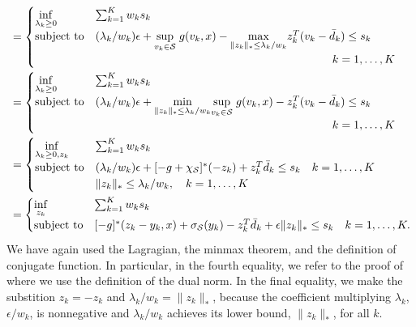 \documentclass[12pt]{article}
\theoremstyle{thmstyleone}%
\theoremstyle{thmstyletwo}%
\theoremstyle{thmstylethree}%
\newcommand{\reviewChanges}{}
\begin{document}
\begin{appendices}
\begin{equation*}
\begin{aligned}
&= \begin{cases}
	\underset{\lambda_k \geq 0}{\inf} &  \sum_{k=1} ^K  w_k s_k \\
	\mbox{subject to} & (\lambda_k/w_k)\epsilon + \underset{v_k\in \supp}{\sup}\hspace{1mm} g(v_k, x) -  \underset{\|z_k\|_* \leq \lambda_k/w_k}{\max} z_k^T(v_k - \bar{d}_k)\le s_k\\
	 &\hspace{7cm}\quad k = 1,\dots,K
\end{cases}\\
&= \begin{cases}
	\underset{\lambda_k \geq 0}{\inf} &  \sum_{k=1} ^K  w_k s_k \\
	\mbox{subject to} & (\lambda_k/w_k)\epsilon +  \underset{\|z_k\|_* \leq \lambda_k/w_k}{\min} \underset{v_k\in \supp}{\sup}\hspace{1mm} g(v_k, x) -   z_k^T(v_k - \bar{d}_k)\le s_k\\
	&\hspace{7cm}\quad k = 1,\dots,K
\end{cases}\\
&= \begin{cases}
	\underset{\lambda_k \geq 0, z_k}{\inf} &  \sum_{k=1} ^K  w_k s_k \\
	\mbox{subject to} & (\lambda_k/w_k)\epsilon + [-g +\chi_{\supp}]^*(-z_k) + z_k^T\bar{d}_k \le s_k \quad k = 1,\dots,K\\
	& \|z_k\|_* \leq \lambda_k/w_k,\quad k = 1,\dots,K
\end{cases}\\
&= \reviewChanges{\begin{cases}
	\underset{z_k}{\inf} &  \sum_{k=1} ^K  w_k s_k \\
	\mbox{subject to} &  [-g]^*(z_{k} - y_{k},x) + \sigma_{\supp}(y_{k})  - z_k^T\bar{d}_k  + \epsilon\|z_k\|_* \le s_k \quad k = 1,\dots,K.\\
\end{cases}}\\
\end{aligned}
\end{equation*}
We have again used the Lagragian, the minmax theorem, and the definition of conjugate function. In particular, in the fourth equality, we refer to the proof of~\cite[Theorem 4.2]{mohajerin_esfahani_data-driven_2018} where we use the definition of the dual norm. \reviewChanges{In the final equality, we make the substition $z_k = -z_k$ and $ \lambda_k/w_k = \|z_k\|_* $, because the coefficient multiplying $\lambda_k$, $\epsilon/w_k$, is nonnegative and $\lambda_k/w_k$ achieves its lower bound, $\|z_k\|_*$, for all $k$.}




\end{appendices}
\end{document}
